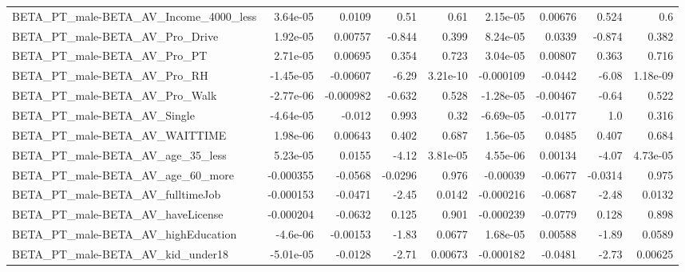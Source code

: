 \begin{tabular}{lrrrrrrrr}
BETA\_PT\_male-BETA\_AV\_Income\_4000\_less              &    3.64e-05 &       0.0109 &      0.51 &     0.61 &   2.15e-05 &     0.00676 &        0.524 &           0.6 \\
BETA\_PT\_male-BETA\_AV\_Pro\_Drive                     &    1.92e-05 &      0.00757 &    -0.844 &    0.399 &   8.24e-05 &      0.0339 &       -0.874 &         0.382 \\
BETA\_PT\_male-BETA\_AV\_Pro\_PT                        &    2.71e-05 &      0.00695 &     0.354 &    0.723 &   3.04e-05 &     0.00807 &        0.363 &         0.716 \\
BETA\_PT\_male-BETA\_AV\_Pro\_RH                        &   -1.45e-05 &     -0.00607 &     -6.29 & 3.21e-10 &  -0.000109 &     -0.0442 &        -6.08 &      1.18e-09 \\
BETA\_PT\_male-BETA\_AV\_Pro\_Walk                      &   -2.77e-06 &    -0.000982 &    -0.632 &    0.528 &  -1.28e-05 &    -0.00467 &        -0.64 &         0.522 \\
BETA\_PT\_male-BETA\_AV\_Single                        &   -4.64e-05 &       -0.012 &     0.993 &     0.32 &  -6.69e-05 &     -0.0177 &          1.0 &         0.316 \\
BETA\_PT\_male-BETA\_AV\_WAITTIME                      &    1.98e-06 &      0.00643 &     0.402 &    0.687 &   1.56e-05 &      0.0485 &        0.407 &         0.684 \\
BETA\_PT\_male-BETA\_AV\_age\_35\_less                   &    5.23e-05 &       0.0155 &     -4.12 & 3.81e-05 &   4.55e-06 &     0.00134 &        -4.07 &      4.73e-05 \\
BETA\_PT\_male-BETA\_AV\_age\_60\_more                   &   -0.000355 &      -0.0568 &   -0.0296 &    0.976 &   -0.00039 &     -0.0677 &      -0.0314 &         0.975 \\
BETA\_PT\_male-BETA\_AV\_fulltimeJob                   &   -0.000153 &      -0.0471 &     -2.45 &   0.0142 &  -0.000216 &     -0.0687 &        -2.48 &        0.0132 \\
BETA\_PT\_male-BETA\_AV\_haveLicense                   &   -0.000204 &      -0.0632 &     0.125 &    0.901 &  -0.000239 &     -0.0779 &        0.128 &         0.898 \\
BETA\_PT\_male-BETA\_AV\_highEducation                 &    -4.6e-06 &     -0.00153 &     -1.83 &   0.0677 &   1.68e-05 &     0.00588 &        -1.89 &        0.0589 \\
BETA\_PT\_male-BETA\_AV\_kid\_under18                   &   -5.01e-05 &      -0.0128 &     -2.71 &  0.00673 &  -0.000182 &     -0.0481 &        -2.73 &       0.00625 \\

\end{tabular}
